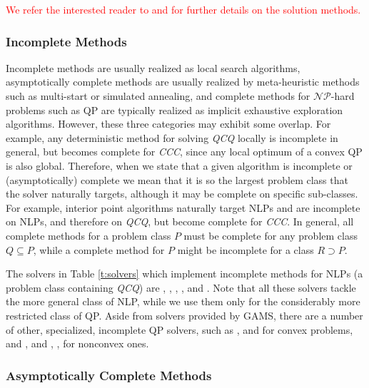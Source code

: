 \textcolor{red}{We refer the interested reader to 
\cite{book:2077007} and 
\cite{lee2006quadratic} for further details on the solution methods.}



\subsubsection{Incomplete Methods}

Incomplete methods are usually realized as local search algorithms, asymptotically complete methods are usually realized by meta-heuristic methods such as multi-start or simulated annealing, and complete methods for $\mathcal{NP}$-hard problems such as QP are typically realized as implicit exhaustive exploration algorithms. However, these three categories may exhibit some overlap. For example, any deterministic method for solving \textit{QCQ} locally is incomplete in general, but becomes complete for \textit{CCC}, since any local optimum of a convex QP is also global. Therefore, when we state that a given algorithm is incomplete or (asymptotically) complete we mean that it is so the largest problem class that the solver naturally targets, although it may be complete on specific sub-classes. For example, interior point algorithms naturally target NLPs and are incomplete on NLPs, and therefore on \textit{QCQ}, but become complete for \textit{CCC}. In general, all complete methods for a problem class $P$ must be complete for any problem class $Q \subseteq P$, while a complete method for $P$ might be incomplete for a class $R \supset P$.

The solvers in Table \ref{t:solvers} which implement incomplete methods for NLPs (a problem class containing \textit{QCQ}) are \conopt, \ipopt, \minos, \snopt, and \knitro. Note that all these solvers tackle the more general class of NLP, while we use them only for the considerably more restricted class of QP. Aside from solvers provided by GAMS, there are a number of other, specialized, incomplete QP solvers, such as
\cqp \cite{GoulOrbaRobi13:mpc},
\dqp \cite{GoulRobi16:coap} and
\ooqp \cite{GertWrig03:toms}
for convex problems, and
\bqpd \cite{Flet:2000},
\qpa \cite{GoulToin02i} and
\qpb \cite{ConnGoulOrbaToin:2000},
\qpc \cite{GoulOrbaToin03:toms},
\sqic \cite{Gill2015}
for nonconvex ones.

\subsubsection{Asymptotically Complete Methods}\label{sss:asymc}

